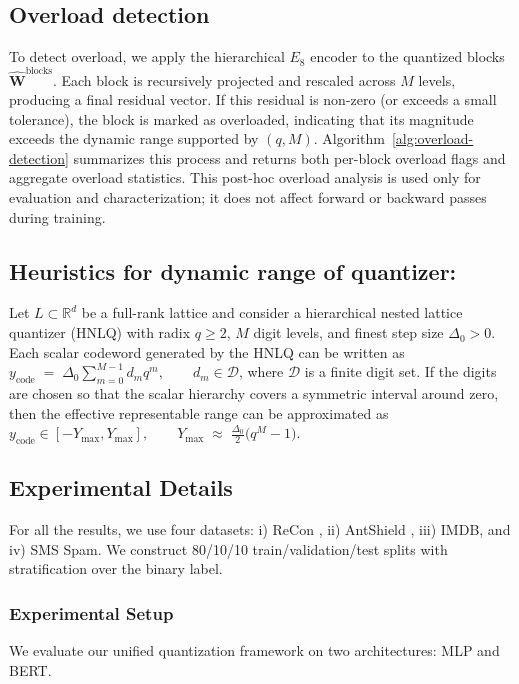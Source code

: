 \documentclass{article}
\theoremstyle{definition}
\theoremstyle{remark}
\begin{document}
\subsection{Overload detection}
To detect overload, we apply the hierarchical $E_8$ encoder to the quantized blocks $\widehat{\mathbf{W}}^{\mathrm{blocks}}$. Each block is recursively projected and rescaled across $M$ levels, producing a final residual vector. If this residual is non-zero (or exceeds a small tolerance), the block is marked as overloaded, indicating that its magnitude exceeds the dynamic range supported by $(q,M)$. Algorithm~\ref{alg:overload-detection} summarizes this process and returns both per-block overload flags and aggregate overload statistics. This post-hoc overload analysis is used only for evaluation and characterization; it does not affect forward or backward passes during training.



\subsection{Heuristics for dynamic range of quantizer:}
\label{theorem}
Let $L \subset \mathbb{R}^d$ be a full-rank lattice and consider a hierarchical
nested lattice quantizer (HNLQ) with radix $q \ge 2$, $M$ digit levels, and
finest step size $\Delta_0 > 0$. Each scalar codeword generated by the HNLQ
can be written as $  y_{\mathrm{code}}
  \;=\;
  \Delta_0 \sum_{m=0}^{M-1} d_m q^m,
  \qquad d_m \in \mathcal{D}$, 
where $\mathcal{D}$ is a finite digit set. If the digits are chosen so that the scalar hierarchy covers a symmetric interval around zero, then the effective representable range can be approximated as
$ y_{\mathrm{code}} \in [-Y_{\max}, Y_{\max}],
  \qquad
  Y_{\max}
  \;\approx\;
  \frac{\Delta_0}{2}\bigl(q^{M} - 1\bigr)$.


\subsection{Experimental Details}
For all the results, we use four datasets: i) ReCon \cite{recon}, ii) AntShield \cite{antsh}, iii) IMDB, and iv) SMS Spam. We construct 80/10/10 train/validation/test splits with stratification over the binary label.
\subsubsection{Experimental Setup}
We evaluate our unified quantization framework on two architectures: MLP and BERT.
\end{document}
